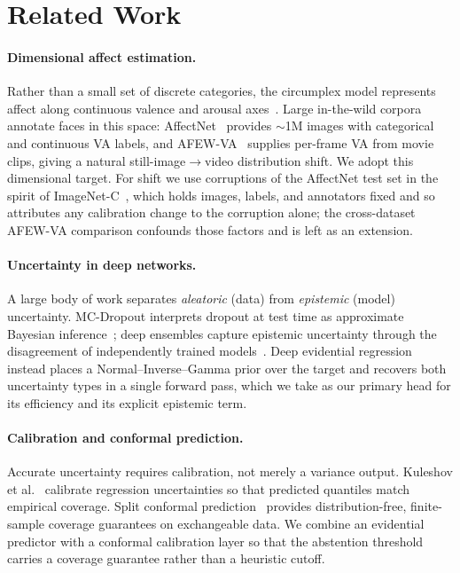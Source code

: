\section{Related Work}

\paragraph{Dimensional affect estimation.} Rather than a small set of discrete
categories, the circumplex model represents affect along continuous valence and
arousal axes~\cite{russell1980circumplex}. Large in-the-wild corpora annotate
faces in this space: AffectNet~\cite{mollahosseini2017affectnet} provides
$\sim$1M images with categorical and continuous VA labels, and
AFEW-VA~\cite{kossaifi2017afew} supplies per-frame VA from movie clips, giving a
natural still-image$\rightarrow$video distribution shift. We adopt this
dimensional target. For shift we use corruptions of the AffectNet test set in the
spirit of ImageNet-C~\cite{hendrycks2019benchmarking}, which holds images,
labels, and annotators fixed and so attributes any calibration change to the
corruption alone; the cross-dataset AFEW-VA comparison confounds those factors
and is left as an extension.

\paragraph{Uncertainty in deep networks.} A large body of work separates
\emph{aleatoric} (data) from \emph{epistemic} (model) uncertainty. MC-Dropout
interprets dropout at test time as approximate Bayesian
inference~\cite{gal2016dropout}; deep ensembles capture epistemic uncertainty
through the disagreement of independently trained
models~\cite{lakshminarayanan2017simple}. Deep evidential
regression~\cite{amini2020evidential} instead places a Normal--Inverse--Gamma
prior over the target and recovers both uncertainty types in a single forward
pass, which we take as our primary head for its efficiency and its explicit
epistemic term.

\paragraph{Calibration and conformal prediction.} Accurate uncertainty requires
calibration, not merely a variance output. Kuleshov et
al.~\cite{kuleshov2018calibrated} calibrate regression uncertainties so that
predicted quantiles match empirical coverage. Split conformal
prediction~\cite{vovk2005algorithmic} provides distribution-free, finite-sample
coverage guarantees on exchangeable data. We combine an evidential predictor with
a conformal calibration layer so that the abstention threshold carries a coverage
guarantee rather than a heuristic cutoff.

